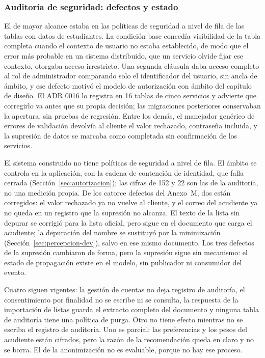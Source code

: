 \subsubsection{Auditoría de seguridad: defectos y estado}


El de mayor alcance estaba en las políticas de seguridad a nivel de fila de las tablas con datos de
estudiantes. La condición base concedía visibilidad de la tabla completa cuando el contexto de
usuario no estaba establecido, de modo que el error más probable en un sistema distribuido, que un
servicio olvide fijar ese contexto, otorgaba acceso irrestricto. Una segunda cláusula daba acceso
completo al rol de administrador comparando solo el identificador del usuario, sin ancla de ámbito,
y ese defecto motivó el modelo de autorización con ámbito del capítulo de diseño. El ADR 0016 lo
registra en 16 tablas de cinco servicios y advierte que corregirlo va antes que su propia decisión;
las migraciones posteriores conservaban la apertura, sin pruebas de regresión. Entre los demás, el
manejador genérico de errores de validación devolvía al cliente el valor rechazado, contraseña
incluida, y la supresión de datos se marcaba como completada sin confirmación de los servicios.


El sistema construido no tiene políticas de seguridad a nivel de fila. El ámbito se controla en la
aplicación, con la cadena de contención de identidad, que falla cerrada
(Sección~\ref{sec:autorizacion}); las cifras de 152 y 22 son las de la auditoría, no una medición
propia. De los catorce defectos del Anexo~M, dos están corregidos: el valor rechazado ya no vuelve
al cliente, y el correo del acudiente ya no queda en un registro que la supresión no alcanza. El
texto de la lista sin depurar se corrigió para la lista oficial, pero sigue en el documento que
carga el acudiente; la depuración del nombre se sustituyó por la minimización
(Sección~\ref{sec:percepcion-dev}), salvo en ese mismo documento. Los tres defectos de la supresión
cambiaron de forma, pero la supresión sigue sin mecanismo: el estado de propagación existe en el
modelo, sin publicador ni consumidor del evento.

Cuatro siguen vigentes: la gestión de cuentas no deja registro de auditoría, el consentimiento por
finalidad no se escribe ni se consulta, la respuesta de la importación de listas guarda el extracto
completo del documento y ninguna tabla de auditoría tiene una política de purga. Otro no tiene
efecto mientras no se escriba el registro de auditoría. Uno es parcial: las preferencias y los pesos
del acudiente están cifrados, pero la razón de la recomendación queda en claro y no se borra. El de
la anonimización no es evaluable, porque no hay ese proceso.

